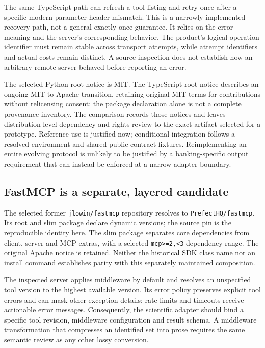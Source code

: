 The same TypeScript path can refresh a tool listing and retry once after a
specific modern parameter-header mismatch. This is a narrowly implemented
recovery path, not a general exactly-once guarantee. It relies on the error
meaning and the server's corresponding behavior. The product's logical
operation identifier must remain stable across transport attempts, while
attempt identifiers and actual costs remain distinct. A source inspection
does not establish how an arbitrary remote server behaved before reporting
an error.~\citep{exec24_mcp_typescript,exec24_mcp_contracts}

The selected Python root notice is MIT. The TypeScript root notice describes
an ongoing MIT-to-Apache transition, retaining original MIT terms for
contributions without relicensing consent; the package declaration alone is
not a complete provenance inventory. The comparison records those notices
and leaves distribution-level dependency and rights review to the exact
artifact selected for a prototype. Reference use is justified now;
conditional integration follows a resolved environment and shared public
contract fixtures. Reimplementing an entire evolving protocol is unlikely
to be justified by a banking-specific output requirement that can instead
be enforced at a narrow adapter boundary.~\citep{exec24_mcp_python,
exec24_mcp_typescript,exec24_mcp_contracts}

\subsection{FastMCP is a separate, layered candidate}

The selected former \texttt{jlowin/fastmcp} repository resolves to
\texttt{PrefectHQ/fastmcp}. Its root and slim package declare dynamic versions;
the source pin is the reproducible identity here. The slim package separates
core dependencies from client, server and MCP extras, with a selected
\texttt{mcp>=2,<3} dependency range. The original Apache notice is retained.
Neither the historical SDK class name nor an install command establishes
parity with this separately maintained composition.
\citep{exec24_mcp_fastmcp}

The inspected server applies middleware by default and resolves an unspecified
tool version to the highest available version. Its error policy preserves
explicit tool errors and can mask other exception details; rate limits and
timeouts receive actionable error messages. Consequently, the scientific
adapter should bind a specific tool revision, middleware configuration and
result schema. A middleware transformation that compresses an identified
set into prose requires the same semantic review as any other lossy
conversion.~\citep{exec24_mcp_fastmcp,exec24_mcp_contracts}

